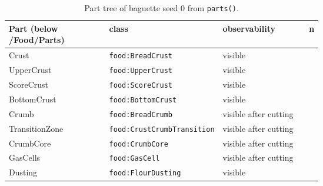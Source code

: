 \documentclass[10.5pt,a4paper]{article}
\begin{document}
\begin{table}[htbp]\centering\scriptsize\caption{Part tree of baguette seed 0 from \texttt{parts()}.}
\begin{tabularx}{\linewidth}{@{}p{0.32\linewidth}p{0.3\linewidth}Xr@{}}\toprule Part (below /Food/Parts) & class & observability & n \\\midrule
\hspace*{0.0em}Crust & \texttt{food:BreadCrust} & visible &  \\
\hspace*{0.9em}UpperCrust & \texttt{food:UpperCrust} & visible &  \\
\hspace*{0.9em}ScoreCrust & \texttt{food:ScoreCrust} & visible &  \\
\hspace*{0.9em}BottomCrust & \texttt{food:BottomCrust} & visible &  \\
\hspace*{0.0em}Crumb & \texttt{food:BreadCrumb} & visible after cutting &  \\
\hspace*{0.9em}TransitionZone & \texttt{food:CrustCrumbTransition} & visible after cutting &  \\
\hspace*{0.9em}CrumbCore & \texttt{food:CrumbCore} & visible after cutting &  \\
\hspace*{0.9em}GasCells & \texttt{food:GasCell} & visible after cutting &  \\
\hspace*{0.0em}Dusting & \texttt{food:FlourDusting} & visible &  \\\bottomrule\end{tabularx}\end{table}
\end{document}
